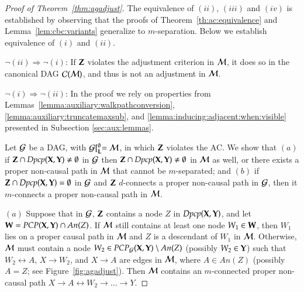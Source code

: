 \begin{proof}[Proof of Theorem~\ref{thm:agadjust}]
The equivalence of $(ii)$, $(iii)$ and $(iv)$ is established by
observing that the proofs of Theorem~\ref{th:ac:equivalence} and Lemma~\ref{lem:cbc:variants}
generalize to $m$-separation. Below we establish
equivalence of $(i)$ and $(ii)$.

$\neg (ii) \Rightarrow \neg (i)$: If
${\bf Z}$ violates the adjustment criterion in ${\cal M}$, it
does so in the canonical DAG ${\cal C}({\cal M})$, and thus 
 is not an adjustment in ${\cal M}$.

$\neg (i) \Rightarrow \neg (ii)$: In the proof we rely on properties from
Lemmas~\ref{lemma:auxiliary:walkpathconversion}, \ref{lemma:auxiliary:truncatemaxsub}, and \ref{lemma:inducing:adjacent:when:visible}
presented in Subsection \ref{sec:aux:lemmas}.

Let ${\cal G}$ be a DAG, with 
${\cal G}[^\emptyset_{\bf L}={\cal M}$, in which ${\bf Z}$ violates the AC. We show
that $(a)$ if ${\bf Z} \cap \textit{Dpcp}({\bf X},{\bf Y})\neq \emptyset$ in ${\cal G}$
then ${\bf Z} \cap \textit{Dpcp}({\bf X},{\bf Y}) \neq \emptyset$ in ${\cal M}$ 
as well, or there exists a proper non-causal 
path in ${\cal M}$ that cannot be $m$-separated; and 
$(b)$ if ${\bf Z} \cap \textit{Dpcp}({\bf X},{\bf Y}) = \emptyset$ in ${\cal G}$ 
and ${\bf Z}$ $d$-connects a proper
non-causal path in ${\cal G}$, then it
$m$-connects a proper non-causal path in ${\cal M}$.

$(a)$ 
Suppose that in ${\cal G}$, ${\bf Z}$ contains a node $Z$ in $\textit{Dpcp}({\bf X},{\bf Y})$,
and let ${\bf W} = \textit{PCP}({\bf X}, {\bf Y})\cap\textit{An}(Z)$.
If ${\cal M}$ still contains at least 
one node $W_1  \in  {\bf W}$,
then $W_1$ lies on a proper causal path in ${\cal M}$ and 
$Z$ is a descendant of $W_1$ in 
${\cal M}$.
Otherwise, ${\cal M}$ must contain a node $W_2 \in 
\textit{PCP}_{\cal G}({\bf X}, {\bf Y}) \setminus 
\textit{An}(Z)$ (possibly 
$W_2 \in {\bf Y}$) such that $W_2 \leftrightarrow A$,
$X \to W_2$, and $X \to A$ are edges in ${\cal M}$, where
$A \in \textit{An}(Z)$
(possibly $A=Z$; see Figure~\ref{fig:agadjust}). Then ${\cal M}$ contains
an $m$-connected proper non-causal
path $X \to A \leftrightarrow W_2 \to \ldots \to Y$.


\end{proof}
